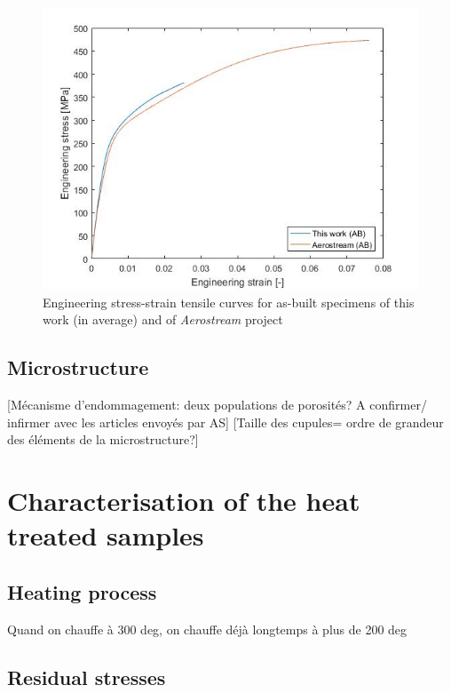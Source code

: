 \begin{figure}[ht]
	\centering
	\centerline{\includegraphics[scale=0.64]{Images/AerAB}}
	\decoRule
	\caption[Engineering stress-strain tensile curves for as-built specimens of this work (in average) and of \textit{Aerostream} project]{Engineering stress-strain tensile curves for as-built specimens of this work (in average) and of \textit{Aerostream} project}
	\label{fig:AerAB}
\end{figure}

\subsection{Microstructure}

[Mécanisme d'endommagement: deux populations de porosités? A confirmer/ infirmer avec les articles envoyés par AS]
[Taille des cupules= ordre de grandeur des éléments de la microstructure?] 

\section{Characterisation of the heat treated samples}

\subsection{Heating process}
Quand on chauffe à 300 deg, on chauffe déjà longtemps à plus de 200 deg

\subsection{Residual stresses}

